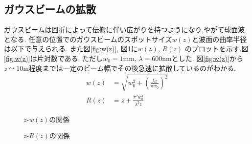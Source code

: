 \subsection{ガウスビームの拡散\cite{jikken}}
ガウスビームは回折によって伝搬に伴い広がりを持つようになり,やがて球面波となる.
任意の位置でのガウスビームのスポットサイズ$w(z)$と波面の曲率半径は以下で与えられる.
また図\ref{fig:w(z)}, 図\ref{fig:R(z)}に$w(z)$, $R(z)$
のプロットを示す.図\ref{fig:w(z)}は片対数である.
ただし$w_0=1\si{\milli\metre}$, $\lambda=600\si{\nano\metre}$とした.
図\ref{fig:w(z)}から$z\simeq10\si{\metre}$程度までは一定のビーム幅でその後急速に拡散しているのがわかる.
\begin{align}
  w(z)&=\sqrt{w_0^2+\left(\frac{\lambda z}{\pi w_0}\right)^2}\\
  R(z)&=z+\frac{\pi^2w_0^4}{\lambda^2z}
\end{align}
\clearpage
\begin{figure}[hptb]
\begin{center}

\caption{$z$-$w(z)$の関係}
\label{fig:w(z)}

\caption{$z$-$R(z)$の関係}
\label{fig:R(z)}
\end{center}
\end{figure}